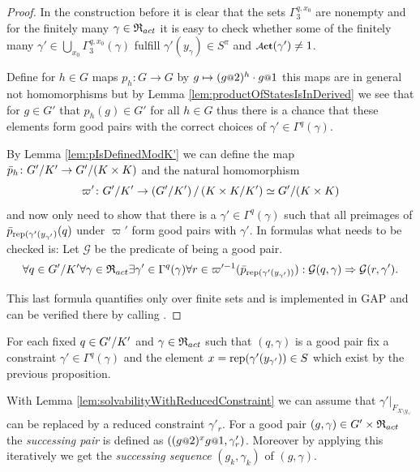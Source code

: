 \documentclass[a4paper,11pt]{amsart}
\begin{document}
\begin{proof}
 In the construction before it is clear that the sets $\Gamma_3^{q,x_0}$ are nonempty and for the finitely many $\gamma\in \mathfrak{R}_{act}$ it is
 easy to check whether some of the finitely many $\gamma'\in\bigcup_{x_0}\Gamma_3^{q,x_0}(\gamma)$ fulfill $\gamma'(y_\gamma) \in S^\pi$ and $\act(\gamma')\neq 1$.
 
 
  Define for $h\in G$ maps $p_h\colon G\to G$ by $g\mapsto (g\at{2})^{h}\cdot g\at{1}$ this maps are in general not homomorphisms but 
  by Lemma \ref{lem:productOfStatesIsInDerived} we see that for $g\in G'$ that $p_h(g)\in G'$ for all $h\in G$ thus there is a chance that these elements form good pairs with
  the correct choices of $\gamma' \in \Gamma^q(\gamma)$. 
 
  By Lemma \ref{lem:pIsDefinedModK'} we can define the map $\bar p_h\colon {G'/K'} \to {G'/(K\times K)}$
 and the natural homomorphism \[\varpi'\colon {G'/K'} \to {\left({G'/K'}\right)/\left({K\times K/K'}\right)} \simeq {G'/(K\times K)} \]
 and now only need to show that there is a $\gamma'\in\Gamma^q(\gamma)$ such that all preimages of $\bar p_{\textup{rep}(\gamma'(y_{\gamma'})}(q)$ under $\varpi'$ 
 form good pairs with $\gamma'$. In formulas what needs to be checked is: Let $\mathcal{G}$ be the predicate of being a good pair. %
 \[\forall q\in{G'/K'}
      \forall \gamma\in\mathfrak{R}_{act} 
	 \exists \gamma'\in \Gamma^q(\gamma)
	    \forall r\in \varpi'^{-1}(\bar p_{\textup{rep}(\gamma'(y_{\gamma'}))}):
	      \mathcal{G}(q,\gamma) \Rightarrow \mathcal{G}(r,\gamma').\]
 
 This last formula quantifies only over finite sets and is implemented in GAP and can be verified there by calling . 
 \end{proof}

 \begin{defi}
 For each fixed $q\in{G'/K'}$ and $\gamma\in \mathfrak{R}_{act}$ such that $(q,\gamma)$ is a good pair
 fix a constraint $\gamma'\in\Gamma^q(\gamma)$ and the element $x=\textup{rep}(\gamma'(y_{\gamma'}))\in S$ which exist by the previous proposition.
 
 With Lemma \ref{lem:solvabilityWithReducedConstraint} we can assume that $\gamma'|_{F_{X\setminus y_{\gamma'}}}$ can be replaced by a reduced constraint $\gamma'_r$. 
 For a good pair $(g,\gamma)\in G'\times\mathfrak{R}_{act}$ the \emph{successing pair} is defined as $\left((g\at{2})^xg\at{1},\gamma'_r\right)$.
 Moreover by applying this iteratively we get the \emph{successing sequence} $(g_k,\gamma_k)$ of $(g,\gamma)$.
 \end{defi}
 
\end{document}
